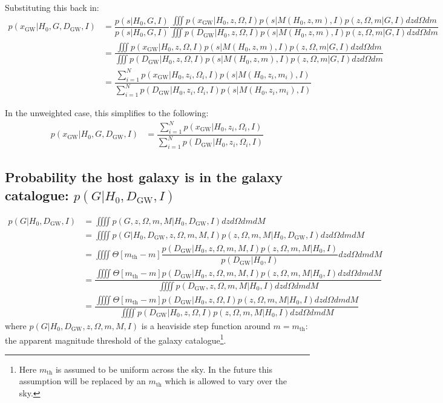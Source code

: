 \documentclass[a4paper,10pt]{article}
\begin{document}
Substituting this back in:
\begin{equation}
\begin{aligned}
p(x_{\text{GW}}|H_0,G,D_{\text{GW}},I) &= \dfrac{p(s|H_0,G,I)}{p(s|H_0,G,I)} \dfrac{\iiint p(x_{\text{GW}}|H_0,z,\Omega,I) p(s|M(H_0,z,m),I) p(z,\Omega,m|G,I) dz d\Omega dm}{\iiint p(D_{\text{GW}}|H_0,z,\Omega,I) p(s|M(H_0,z,m),I) p(z,\Omega,m|G,I) dz d\Omega dm}
\\ &= \dfrac{\iiint p(x_{\text{GW}}|H_0,z,\Omega,I) p(s|M(H_0,z,m),I) p(z,\Omega,m|G,I) dz d\Omega dm}{\iiint p(D_{\text{GW}}|H_0,z,\Omega,I) p(s|M(H_0,z,m),I) p(z,\Omega,m|G,I) dz d\Omega dm}
\\ &= \dfrac{\sum^N_{i=1} p(x_{\text{GW}}|H_0,z_i,\Omega_i,I) p(s|M(H_0,z_i,m_i),I)}{\sum^N_{i=1} p(D_{\text{GW}}|H_0,z_i,\Omega_i,I) p(s|M(H_0,z_i,m_i),I)}
\end{aligned}
\end{equation}

In the unweighted case, this simplifies to the following:
\begin{equation}
\begin{aligned}
p(x_{\text{GW}}|H_0,G,D_{\text{GW}},I) &= \dfrac{\sum^N_{i=1} p(x_{\text{GW}}|H_0,z_i,\Omega_i,I) }{\sum^N_{i=1} p(D_{\text{GW}}|H_0,z_i,\Omega_i,I)}
\end{aligned}
\end{equation}



\subsection{Probability the host galaxy is in the galaxy catalogue: $p(G|H_0,D_{\text{GW}},I)$}


\begin{equation}
\begin{aligned}
p(G|H_0,D_{\text{GW}},I) &= \iiiint p(G,z,\Omega,m,M|H_0,D_{\text{GW}},I) dz d\Omega dm dM
\\ &= \iiiint p(G|H_0,D_{\text{GW}},z,\Omega,m,M,I) p(z,\Omega,m,M|H_0,D_{\text{GW}},I) dz d\Omega dm dM
\\ &= \iiiint \Theta[m_{\text{th}}-m] \dfrac{p(D_{\text{GW}}|H_0,z,\Omega,m,M,I) p(z,\Omega,m,M|H_0,I)}{p(D_{\text{GW}}|H_0,I)}  dz d\Omega dm dM
\\ &=  \dfrac{\iiiint \Theta[m_{\text{th}}-m] p(D_{\text{GW}}|H_0,z,\Omega,m,M,I) p(z,\Omega,m,M|H_0,I) dz d\Omega dm dM}{\iiiint p(D_{\text{GW}},z,\Omega,m,M|H_0,I) dz d\Omega dm dM} 
\\ &=  \dfrac{\iiiint \Theta[m_{\text{th}}-m] p(D_{\text{GW}}|H_0,z,\Omega,I) p(z,\Omega,m,M|H_0,I) dz d\Omega dm dM}{\iiiint p(D_{\text{GW}}|H_0,z,\Omega,I) p(z,\Omega,m,M|H_0,I) dz d\Omega dm dM} 
\end{aligned}
\end{equation}
where $p(G|H_0,D_{\text{GW}},z,\Omega,m,M,I)$ is a heaviside step function around $m = m_{\text{th}}$: the apparent magnitude threshold of the galaxy catalogue\footnote{Here $m_{\text{th}}$ is assumed to be uniform across the sky.  In the future this assumption will be replaced by an $m_{\text{th}}$ which is allowed to vary over the sky.}.
\end{document}
